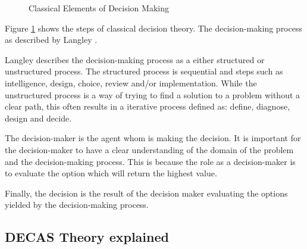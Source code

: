 \begin{figure}[h]
    \centering
    \caption{Classical Elements of Decision Making}
    \label{fig:ClassicalElements}
\end{figure}

Figure \ref{fig:ClassicalElements} shows the steps of classical decision theory. The decision-making process as described
by Langley \cite{Langley1995}. 

Langley describes the decision-making process as a either structured or unstructured process.
The structured process is sequential and steps such as intelligence, design, choice, review and/or implementation.
While the unstructured process is a way of trying to find a solution to a problem without a clear path, this
often results in a iterative process defined as: define, diagnose, design and decide.

The decision-maker is the agent whom is making the decision. It is important
for the decision-maker to have a clear understanding of the domain 
of the problem and the decision-making process. This is because the role as 
a decision-maker is to evaluate the option which will return the highest value.

Finally, the decision is the result of the decision maker evaluating the 
options yielded by the decision-making process. 

\subsection{DECAS Theory explained}

